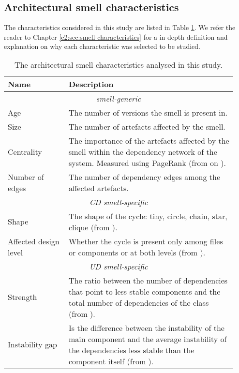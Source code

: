 \subsection{Architectural smell characteristics}\label{c4:sec:smell-characteristics}
The characteristics considered in this study are listed in Table \ref{c4:tab:characteristics}.
We refer the reader to Chapter \ref{c2:sec:smell-characteristics} for a in-depth definition and explanation on why each characteristic was selected to be studied.

\begin{table}[tbp]
    \footnotesize
    \centering
    \caption{The architectural smell characteristics analysed in this study.}\label{c4:tab:characteristics}
    \begin{tabular}{p{0.25\linewidth}|p{0.69\linewidth}}\toprule
        \textbf{Name} & \textbf{Description} \\ \midrule
        \multicolumn{2}{c}{\itshape smell-generic} \\ \midrule
        Age & The number of versions the smell is present in. \\
        Size & The number of artefacts affected by the smell. \\
        Centrality & The importance of the artefacts affected by the smell within the dependency network of the system.  Measured using PageRank (from on \cite{Roveda2018}). \\
        Number of edges & The number of dependency edges among the affected artefacts. \\ \midrule
        \multicolumn{2}{c}{\itshape CD smell-specific}\\\midrule
        Shape & The shape of the cycle: tiny, circle, chain, star, clique (from \cite{AlMutawa2014}). \\
        Affected design level & Whether the cycle is present only among files or components or at both levels (from \cite{AlMutawa2014}). \\ \midrule
        \multicolumn{2}{c}{\itshape UD smell-specific}\\\midrule
        Strength & The ratio between the number of dependencies that point to less stable components and the total number of dependencies of the class (from \cite{Arcelli2016}). \\
        Instability gap & Is the difference between the instability of the main component and the average instability of the dependencies less stable than the component itself  (from \cite{Arcelli2016}). \\\midrule

\end{tabular}
\end{table}
